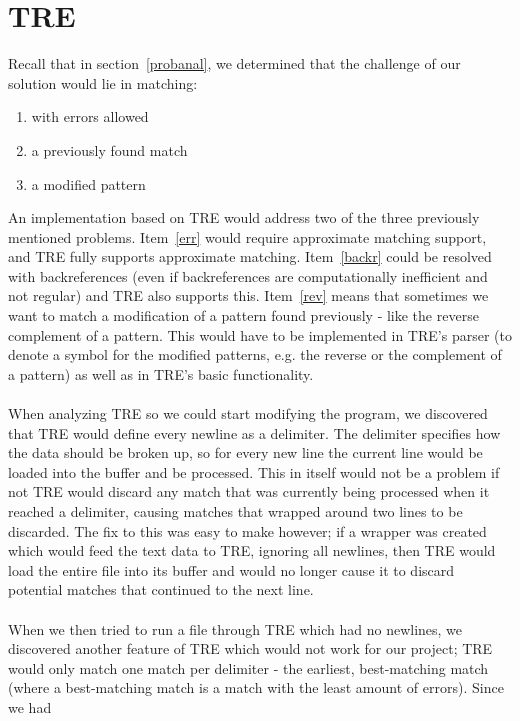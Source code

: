 \section{TRE}\label{tre}
Recall that in section~\ref{probanal}, we determined that the challenge of our 
solution would lie in matching:
\begin{enumerate}
\item \label{err} with errors allowed
\item \label{backr} a previously found match 
\item \label{rev} a modified pattern
\end{enumerate}
An implementation based on TRE would address two of the three previously mentioned 
problems. Item~\ref{err} would require approximate matching support, and 
TRE fully supports approximate matching. Item~\ref{backr} could be resolved 
with backreferences (even if backreferences are computationally inefficient and not regular) 
and TRE also supports this. Item~\ref{rev} means that sometimes we want to 
match a modification of a pattern found previously - like the reverse 
complement of a pattern. This would have to be implemented in TRE's parser 
(to denote a symbol for the modified patterns, e.g. the reverse or the 
complement of a pattern) as 
well as in TRE's basic functionality.\\\\
When analyzing TRE so we could start modifying the 
program, we discovered that TRE would define every newline as a delimiter. The 
delimiter specifies how the data should be broken up, so for every new line 
the current line would be loaded into the buffer and be processed. This in 
itself would not be a problem if not TRE would discard any match that 
was currently being processed when it reached a delimiter, causing matches that 
wrapped around two lines to be discarded. The fix to this was easy to make 
however; if a wrapper was created which would feed the text data to TRE, 
ignoring all newlines, then TRE would load the entire file into its buffer 
and would no longer cause it to discard potential matches that continued to 
the next line.\\\\
When we then tried to run a file through TRE which had no newlines, we discovered 
another feature of TRE which would not work for our project; TRE would only 
match one match per delimiter - the earliest, best-matching match (where a 
best-matching match is a match with the least amount of errors). Since we had 
